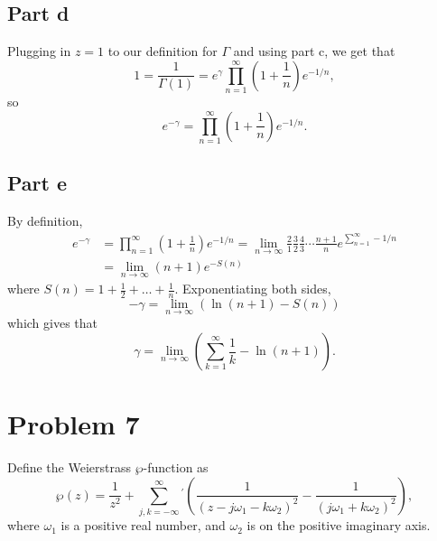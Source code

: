 \documentclass{article}
\begin{document}
\subsection{Part d}
Plugging in $z=1$ to our definition for $\Gamma$ and using part c, we get that 
\[
1=\frac{1}{\Gamma(1)}=e^\gamma\prod_{n=1}^\infty\left(1 + \frac{1}{n}\right)e^{-1/n},
\]
so
\[
e^{-\gamma}=\prod_{n=1}^\infty\left(1 + \frac{1}{n}\right)e^{-1/n}.
\]

\subsection{Part e}
By definition, 
\begin{align*}
e^{-\gamma}&=\prod_{n=1}^\infty\left(1 + \frac{1}{n}\right)e^{-1/n}=\lim_{n\to\infty}\frac{2}{1}\frac{3}{2}\frac{4}{3}\cdots\frac{n+1}{n}e^{\sum_{n=1}^\infty-1/n}\\&=
\lim_{n\to\infty}(n+1)e^{-S(n)}
\end{align*}
where $S(n)=1+\frac{1}{2}+\ldots+\frac{1}{n}$.
Exponentiating both sides,
\[
-\gamma=\lim_{n\to\infty}(\ln(n+1)-S(n))
\]
which gives that 
\[
\gamma=\lim_{n\to\infty}\left(\sum_{k=1}^\infty\frac{1}{k}-\ln(n+1)\right).
\]

\section{Problem 7}
Define the Weierstrass $\wp$-function as
	\[
	\wp(z)=\frac{1}{z^2}+\sum_{j,k=-\infty}^{\infty}{}^{'} \left(\frac{1}{(z-j
	\omega_1-k \omega_2)^2}-\frac{1}{(j \omega_1+k \omega_2)^2}\right),
	\]
where $\omega_1$ is a positive real number, and $\omega_2$ is on the positive imaginary axis.
\end{document}
